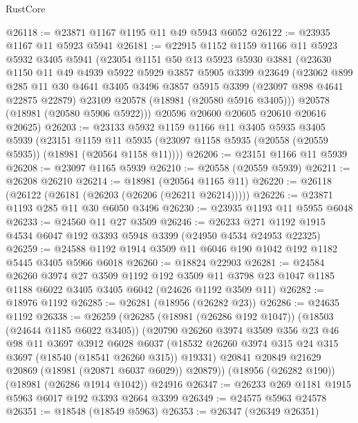\begin{lexlean}{RustCore}
\begin{coremodule}
@26118 := @23871 @1167 @1195 @11 @49 @5943 @6052
@26122 := @23935 @1167 @11 @5923 @5941
@26181 := @22915
    @1152
    @1159
    @1166
    @11
    @5923
    @5932
    @3405
    @5941
    (@23054
      @1151
      @50
      @13
      @5923
      @5930
      @3881
      (@23630
        @1150
        @11
        @49
        @4939
        @5922
        @5929
        @3857
        @5905
        @3399
        @23649
        (@23062
          @899
          @285
          @11
          @30
          @4641
          @3405
          @3496
          @3857
          @5915
          @3399
          (@23097 @898 @4641 @22875 @22879)
          @23109
          @20578
          (@18981 (@20580 @5916 @3405)))
        @20578
        (@18981 (@20580 @5906 @5922)))
      @20596
      @20600
      @20605
      @20610
      @20616
      @20625)
@26203 := @23133
    @5932
    @1159
    @1166
    @11
    @3405
    @5935
    @3405
    @5939
    (@23151
      @1159
      @11
      @5935
      (@23097 @1158 @5935 (@20558 (@20559 @5935)) (@18981 (@20564 @1158 @11))))
@26206 := @23151 @1166 @11 @5939
@26208 := @23097 @1165 @5939
@26210 := @20558 (@20559 @5939)
@26211 := @26208 @26210
@26214 := @18981 (@20564 @1165 @11)
@26220 := @26118 (@26122 (@26181 (@26203 (@26206 (@26211 @26214)))))
@26226 := @23871 @1193 @285 @11 @30 @6050 @3496
@26230 := @23935 @1193 @11 @5955 @6048
@26233 := @24560 @11 @27 @3509
@26246 := @26233 @271 @1192 @1915 @4534 @6047 @192 @3393 @5948 @3399 (@24950 @4534 @24953 @22325)
@26259 := @24588 @1192 @1914 @3509 @11 @6046 @190 @1042 @192 @1182 @5445 @3405 @5966 @6018
@26260 := @18824 @22903
@26281 := @24584
    @26260
    @3974
    @27
    @3509
    @1192
    @192
    @3509
    @11
    @3798
    @23
    @1047
    @1185
    @1188
    @6022
    @3405
    @3405
    @6042
    (@24626 @1192 @3509 @11)
@26282 := @18976 @1192
@26285 := @26281 (@18956 (@26282 @23))
@26286 := @24635 @1192
@26338 := @26259
    (@26285
      (@18981 (@26286 @192 @1047))
      (@18503 (@24644 @1185 @6022 @3405))
      (@20790
        @26260
        @3974
        @3509
        @356
        @23
        @46
        @98
        @11
        @3697
        @3912
        @6028
        @6037
        (@18532 @26260 @3974 @315 @24 @315 @3697 (@18540 (@18541 @26260 @315)) @19331)
        @20841
        @20849
        @21629
        @20869
        (@18981 (@20871 @6037 @6029))
        @20879))
    (@18956 (@26282 @190))
    (@18981 (@26286 @1914 @1042))
    @24916
@26347 := @26233 @269 @1181 @1915 @5963 @6017 @192 @3393 @2664 @3399
@26349 := @24575 @5963 @24578
@26351 := @18548 (@18549 @5963)
@26353 := @26347 (@26349 @26351)

\end{coremodule}
\end{lexlean}
